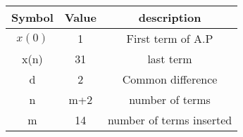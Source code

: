 \begin{table}[!h]
\begin{center}
\renewcommand\thetable{1}
\begin{tabular}{ |c|c|c| } 
  \hline
    Symbol & Value & description \\ 
  \hline
  $x(0)$ & 1 & First term of A.P  \\ 
  \hline
  x(n) & 31 & last term \\
  \hline
  d & 2 & Common difference \\ 
  \hline
  n & m+2 & number of terms \\
  \hline
  m & 14 & number of terms inserted \\
  \hline
\end{tabular}
\end{center}
\caption{}
\end{table}\\
